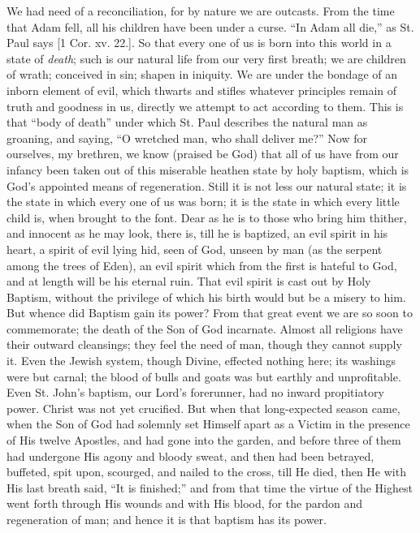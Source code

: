 We had need of a reconciliation, for by nature we are outcasts. From
the time that Adam fell, all his children have been under a curse.
``In Adam all die,'' as St. Paul says [1 Cor. xv. 22.]. So that
every one of us is born into this world in a state of \emph{death}; such
is our natural life from our very first breath; we are children of
wrath; conceived in sin; shapen in iniquity. We are under the bondage of
an inborn element of evil, which thwarts and stifles whatever principles
remain of truth and goodness in us, directly we attempt to act according
to them. This is that ``body of death'' under which St. Paul
describes the natural man as groaning, and saying, ``O wretched man,
who shall deliver me?'' Now for ourselves, my brethren, we know
(praised be God) that all of us have from our infancy been taken out of
this miserable heathen state by holy baptism, which is God's appointed
means of regeneration. Still it is not less our natural state; it is the
state in which every one of us was born; it is the state in which every
little child is, when brought to the font. Dear as he is to those who
bring him thither, and innocent as he may look, there is, till he is
baptized, an evil spirit in his heart, a spirit of evil lying hid, seen
of God, unseen by man (as the serpent among the trees of Eden), an evil
spirit which from the first is hateful to God, and at length will be his
eternal ruin. That evil spirit is cast out by Holy Baptism, without the
privilege of which his birth would but be a misery to him. But whence
did Baptism gain its power? From that great event we are so soon to
commemorate; the death of the Son of God incarnate. Almost all religions
have their outward cleansings; they feel the need of man, though they
cannot supply it. Even the Jewish system, though Divine, effected
nothing here; its washings were but carnal; the blood of bulls and goats
was but earthly and unprofitable. Even St. John's baptism, our Lord's
forerunner, had no inward propitiatory power. Christ was not yet
crucified. But when that long-expected season came, when the Son of God
had solemnly set Himself apart as a Victim in the presence of His twelve
Apostles, and had gone into the garden, and before three of them had
undergone His agony and bloody sweat, and then had been betrayed,
buffeted, spit upon, scourged, and nailed to the cross, till He died,
then He with His last breath said, ``It is finished;'' and from
that time the virtue of the Highest went forth through His wounds and
with His blood, for the pardon and regeneration of man; and hence it is
that baptism has its power.

